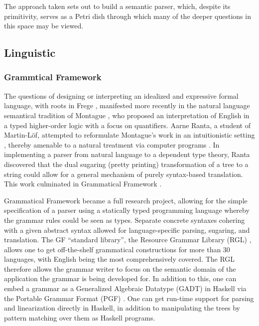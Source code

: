 \documentclass{article}
\begin{document}
The approach taken sets out to build a semantic parser, which, despite its
primitivity, serves as a Petri dish through which many of the deeper questions
in this space may be viewed.

\subsection{Linguistic}

\subsubsection{Grammtical Framework}

The questions of designing or interpreting an idealized and expressive formal
language, with roots in Frege \cite{frege79}, manifested more recently in the
natural language semantical tradition of Montague \cite{Montague1973}, who
proposed an interpretation of English in a typed higher-order logic with a focus
on quantifiers. Aarne Ranta, a student of Martin-Löf, attempted to reformulate
Montague's work in an intuitionistic setting \cite{ranta1994type}, thereby
amenable to a natural treatment via computer programs \cite{ml79}. In
implementing a parser from natural language to a dependent type theory, Ranta
discovered that the dual sugaring (pretty printing) transformation of a tree to
a string could allow for a general mechanism of purely syntax-based translation.
This work culminated in Grammatical Framework \cite{ranta_2004}.

Grammatical Framework became a full research project, allowing for the simple
specification of a parser using a statically typed programming language whereby
the grammar rules could be seen as types. Separate concrete syntaxes cohering
with a given abstract syntax allowed for language-specific parsing, sugaring,
and translation. The GF ``standard library'', the Resource Grammar Library (RGL)
\cite{ranta2009rgl}, allows one to get off-the-shelf grammatical constructions
for more than 30 languages, with English being the most comprehensively covered.
The RGL therefore allows the grammar writer to focus on the semantic domain of
the application the grammar is being developed for. In addition to this, one can
embed a grammar as a Generalized Algebraic Datatype (GADT) in Haskell via the
Portable Grammar Format (PGF) \cite{angelov2010pgf}. One can get run-time
support for parsing and linearization directly in Haskell, in addition to
manipulating the trees by pattern matching over them as Haskell programs.
\end{document}

